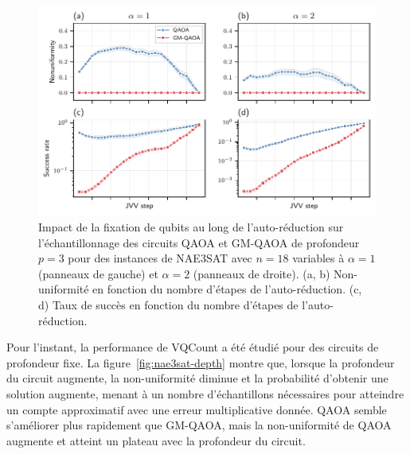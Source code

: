 \begin{figure}[H]
    \centering
    \includegraphics[width=1\textwidth]{figures/nae3sat-jvv-steps}
    \caption[Impact de la procédure d'auto-réduction sur la non-uniformité pour \#NAE3SAT]{Impact de la fixation de qubits au long de l'auto-réduction sur l'échantillonnage des circuits QAOA et GM-QAOA de profondeur $p=3$ pour des instances de NAE3SAT avec $n=18$ variables à $\alpha=1$ (panneaux de gauche) et $\alpha=2$ (panneaux de droite). (a, b) Non-uniformité en fonction du nombre d'étapes de l'auto-réduction. (c, d) Taux de succès en fonction du nombre d'étapes de l'auto-réduction.}
    \label{fig:nae3sat-jvv-steps}
\end{figure}

Pour l'instant, la performance de VQCount a été étudié pour des circuits de profondeur fixe. La figure~\ref{fig:nae3sat-depth} montre que, lorsque la profondeur du circuit augmente, la non-uniformité diminue et la probabilité d'obtenir une solution augmente, menant à un nombre d'échantillons nécessaires pour atteindre un compte approximatif avec une erreur multiplicative donnée. QAOA semble s'améliorer plus rapidement que GM-QAOA, mais la non-uniformité de QAOA augmente et atteint un plateau avec la profondeur du circuit.

